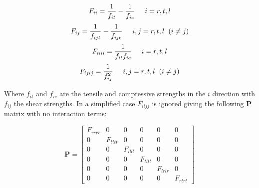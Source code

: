 \documentclass[10pt]{article}
\begin{document}
\begin{equation}\label{equ:F_vals1}
F_{ii} = \frac{1}{f_{it}}-\frac{1}{f_{ic}} \hspace{0.5cm} i = r,t,l\hspace{0.2cm}\\
\end{equation}
\begin{equation}\label{equ:F_vals2}
F_{ij} = \frac{1}{f_{ijt}}-\frac{1}{f_{ijc}} \hspace{0.5cm} i,j = r,t,l \hspace{0.2cm} (i\neq j)\hspace{0.2cm}\\
\end{equation}
\begin{equation}\label{equ:F_vals3}
F_{iiii} = \frac{1}{f_{it}f_{ic}} \hspace{0.5cm} i = r,t,l\hspace{0.2cm}\\
\end{equation}
\begin{equation}\label{equ:F_vals4}
F_{ijij} = \frac{1}{f_{ij}^2} \hspace{0.5cm} i,j = r,t,l \hspace{0.2cm} (i\neq j)
\end{equation}


Where \(f_{it}\) and \(f_{ic}\) are the tensile and compressive strengths in the \(i\) direction with \(f_{ij}\) the shear strengths. In a simplified case  \(F_{iijj}\) is ignored giving the following \(\boldsymbol{P}\) matrix with no interaction terms:

\begin{equation}\label{equ:P_mat_k0}
\boldsymbol{P}=\begin{bmatrix}
	F_{rrrr}&0&0&0&0&0\\
	0&F_{tttt}&0&0&0&0\\
	0&0&F_{llll}&0&0&0\\
	0&0&0&F_{tltl}&0&0\\
	0&0&0&0&F_{lrlr}&0\\
	0&0&0&0&0&F_{rtrt}
	\end{bmatrix}
\end{equation}
\end{document}
